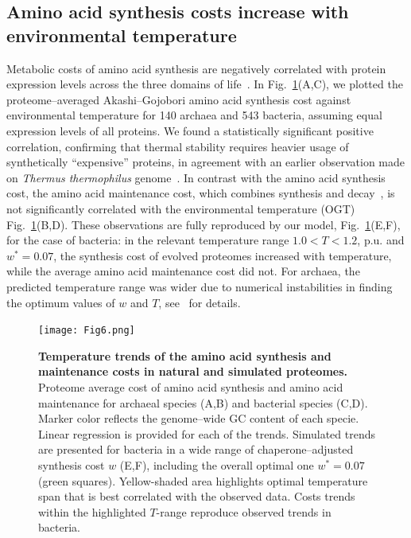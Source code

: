 \documentclass[10pt,letterpaper]{article}
\begin{document}
\subsection*{Amino acid synthesis costs increase with environmental temperature}

Metabolic costs of amino acid synthesis are negatively correlated with protein expression levels across the three domains of life~\cite{Akashi2002Metabolic,Swire2007Selection}. In Fig.~\ref{fig:fig6}(A,C), we plotted the proteome--averaged Akashi--Gojobori amino acid synthesis cost against environmental temperature for 140 archaea and 543 bacteria, assuming equal expression levels of all proteins. We found a statistically significant positive correlation, confirming that thermal stability requires heavier usage of synthetically ``expensive'' proteins, in agreement with an earlier observation made on {\it Thermus thermophilus} genome~\cite{Swire2007Selection}. In contrast with the amino acid synthesis cost, the amino acid maintenance cost, which combines synthesis and decay~\cite{Krick2014Amino}, is not significantly correlated with the environmental temperature (OGT) Fig.~\ref{fig:fig6}(B,D). These observations are fully reproduced by our model, Fig.~\ref{fig:fig6}(E,F), for the case of bacteria: in the relevant temperature range $1.0 < T < 1.2$, p.u. and $w^*=0.07$, the synthesis cost of evolved proteomes increased with temperature, while the average amino acid maintenance cost did not. For archaea, the predicted temperature range was wider due to numerical instabilities in finding the optimum values of $w$ and $T$, see~ for details.


\begin{figure}[h!]
\texttt{[image: Fig6.png]}
\caption{
{\bf Temperature trends of the amino acid synthesis and maintenance costs in natural and simulated proteomes.}
Proteome average cost of amino acid synthesis and amino acid maintenance for archaeal species (A,B) and bacterial species (C,D). Marker color reflects the genome--wide GC content of each specie. Linear regression is provided for each of the trends.
Simulated trends are presented for bacteria in a wide range of chaperone--adjusted synthesis cost $w$ (E,F), including the overall optimal one $w^*=0.07$ (green squares). Yellow-shaded area highlights optimal temperature span that is best correlated with the observed data. Costs trends within the highlighted $T$-range reproduce observed trends in bacteria.
}
\label{fig:fig6}
\end{figure}
\end{document}
